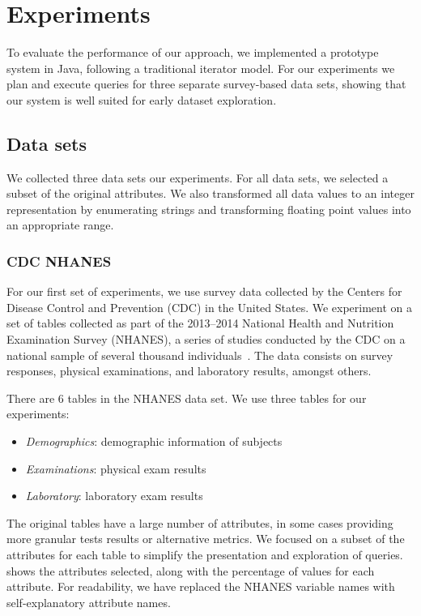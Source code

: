 \section{Experiments}\label{sec:experiments}
To evaluate the performance of our approach,  we implemented
a prototype system in Java, following a traditional iterator model.
For our experiments we plan and execute queries
for three separate survey-based data sets, showing that our system
is well suited for early dataset exploration.

\subsection{Data sets}\label{subsec:datasets}
We collected three data sets our experiments.
For all data sets, we selected a subset of the original attributes.
We also transformed all data values to an integer representation by enumerating strings and transforming floating point values into an appropriate range.

\subsubsection{CDC NHANES}
For our first set of experiments, we use survey data collected by the 
Centers for Disease Control and Prevention (CDC) in the United States. We
experiment on a set of tables collected as part of the 2013--2014 National
Health and Nutrition Examination Survey (NHANES), a series of studies
conducted by the CDC on a national sample of several thousand individuals~\cite{cdc-data}.
The data consists on survey responses, physical examinations, and laboratory
results, amongst others.

There are 6 tables in the NHANES data set. We use three tables for our experiments:

\begin{itemize}
	\item \emph{Demographics}: demographic information of subjects
	\item \emph{Examinations}: physical exam results
	\item \emph{Laboratory}: laboratory exam results
\end{itemize}

The original tables have a large number of attributes, in some cases providing more granular tests results or alternative metrics.
We focused on a subset of the attributes for each table to simplify the presentation and exploration of queries.
 shows the attributes selected, along with the percentage of \nullv{} values for each attribute.
For readability, we have replaced the NHANES variable names with self-explanatory attribute names.

